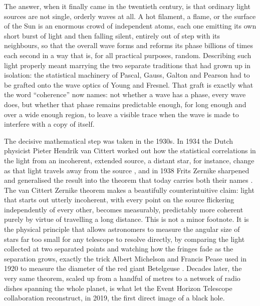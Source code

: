 	The answer, when it finally came in the twentieth century, is that ordinary light
	sources are not single, orderly waves at all. A hot filament, a flame, or the surface of
	the Sun is an enormous crowd of independent atoms, each one emitting its own short burst
	of light and then falling silent, entirely out of step with its neighbours, so that the
	overall wave forms and reforms its phase billions of times each second in a way that is,
	for all practical purposes, random. Describing such light properly meant marrying the two
	separate traditions that had grown up in isolation: the statistical machinery of Pascal,
	Gauss, Galton and Pearson had to be grafted onto the wave optics of Young and Fresnel.
	That graft is exactly what the word ``coherence'' now names: not whether a wave has a
	phase, every wave does, but whether that phase remains predictable enough, for long
	enough and over a wide enough region, to leave a visible trace when the wave is made to
	interfere with a copy of itself.

	The decisive mathematical step was taken in the 1930s. In 1934 the Dutch physicist
	Pieter Hendrik van Cittert worked out how the statistical correlations in the light from
	an incoherent, extended source, a distant star, for instance, change as that light
	travels away from the source \cite{vancittert1934}, and in 1938 Frits Zernike
	sharpened and generalised the result into the theorem that today carries both their
	names \cite{zernike1938}. The van Cittert Zernike theorem makes a beautifully
	counterintuitive claim: light that starts out utterly incoherent, with every point on the
	source flickering independently of every other, becomes measurably, predictably more
	coherent purely by virtue of travelling a long distance. This is not a minor footnote. It
	is the physical principle that allows astronomers to measure the angular size of stars
	far too small for any telescope to resolve directly, by comparing the light collected at
	two separated points and watching how the fringes fade as the separation grows, exactly
	the trick Albert Michelson and Francis Pease used in 1920 to measure the diameter of the
	red giant Betelgeuse \cite{michelson1921diameter}. Decades later, the very same theorem,
	scaled up from a handful of metres to a network of radio dishes spanning the whole planet,
	is what let the Event Horizon Telescope collaboration reconstruct, in 2019, the first
	direct image of a black hole.

